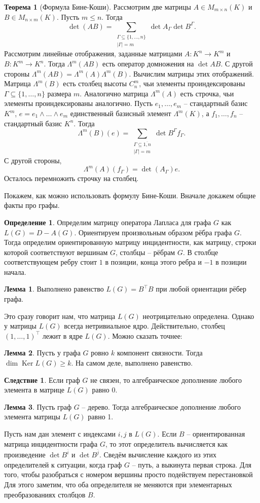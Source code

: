 \documentclass[10pt,a4paper,oneside]{book}
\theoremstyle{definition}
\newtheorem*{defn}{\color{yellow!30!red} Определение}
\newtheorem{thm}{\color{red!40!black}Теорема}
\newtheorem{lem}{\color{green!50!black}Лемма}
\newtheorem{cor}{\color{green!45!black}Следствие}
\renewcommand{\leq}{\leqslant}
\renewcommand{\geq}{\geqslant}
\newcommand{\ovl}{\overline}
\DeclareMathOperator{\Ker}{Ker}
\def\thrm{\begin{thm}}
\def\ethrm{\end{thm}}
\def\dfn{\begin{defn}}
\def\edfn{\end{defn}}
\def\lm{\begin{lem}}
\def\elm{\end{lem}}
\def\crl{\begin{cor}}
\def\ecrl{\end{cor}}
\begin{document}
\thrm[Формула Бине-Коши] Рассмотрим две матрицы $A\in M_{m\times n}(K)$ и $B\in M_{n\times m}(K)$. Пусть $m\leq n$. Тогда
$$\det(AB)=\sum_{\substack{\Gamma \subseteq \{1,\dots,n\}\\ |\Gamma|=m}} \det A_{\Gamma} \det B^{\Gamma}.$$
\proof Рассмотрим линейные отображения, заданные матрицами $A\colon K^n \to K^m$ и  $B \colon K^m \to K^n$. Тогда $\Lambda^m (AB)$ есть оператор домножения на $\det AB$. С другой стороны $\Lambda^m(AB)=\Lambda^m(A) \Lambda^m(B)$. Вычислим матрицы этих отображений. Матрица $\Lambda^m(B)$ есть столбец высоты $C_n^m$, чьи элементы проиндексированы $\Gamma \subseteq \{1,\dots,n\}$ размера $m$. Аналогично матрица $\Lambda^m(A)$  есть строчка, чьи элементы проиндексированы аналогично.
Пусть $e_1,\dots,e_m$ -- стандартный базис $K^m$, $e=e_1\wedge \dots \wedge e_m$ единственный базисный элемент $\Lambda^m(K)$, а $f_1,\dots,f_n$ -- стандартный базис $K^n$. Тогда 
$$\Lambda^m(B)(e)=\sum_{\substack{\Gamma \subseteq \ovl{1,n} \\ |\Gamma|=m}} \det B^{\Gamma} f_{\Gamma}.$$
 С другой стороны, 
$$\Lambda^m(A)(f_{\Gamma})=\det(A_{\Gamma})e.$$
Осталось перемножить строчку на столбец.
\endproof
\ethrm

Покажем, как можно использовать формулу Бине-Коши. Вначале докажем общие факты про графы.

\dfn Определим матрицу оператора Лапласа для графа $G$ как $L(G)=D-A(G)$.
Ориентируем произвольным образом рёбра графа $G$. Тогда определим ориентированную матрицу инцидентности, как матрицу, строки которой соответствуют вершинам $G$, столбцы -- рёбрам $G$. В столбце соответствующем ребру стоит $1$ в позиции, конца этого ребра и $-1$ в позиции начала. 
\edfn

\lm Выполнено равенство $L(G)=B^\top B$ при любой ориентации рёбер графа.
\elm

Это сразу говорит нам, что матрица $L(G)$ неотрицательно определена. Однако у матрицы $L(G)$ всегда нетривиальное ядро. Действительно, столбец $(1,\dots,1)^\top$ лежит в ядре $L(G)$. Можно сказать точнее:

\lm Пусть у графа $G$ ровно $k$ компонент связности. Тогда $\dim \Ker L(G)\geq k$. На самом деле, выполнено равенство.   
\elm

\crl Если граф $G$ не связен, то алгебраическое дополнение любого элемента в матрице $L(G)$ равно $0$.
\ecrl

\lm Пусть граф $G$ -- дерево. Тогда алгебраическое дополнение любого элемента матрицы $L(G)$ равно 1.
\elm
\proof Пусть нам дан элемент с индексами $i,j$ в $L(G)$. Если $B$ -- ориентированная матрица инцидентности графа $G$, то этот определитель вычисляется как произведение  $\det B^{\ovl{i}}$ и $\det B^{\ovl{j}}$. Сведём вычисление каждого из этих определителей к ситуации, когда граф $G$ -- путь, а выкинута первая строка. Для того, чтобы разобраться с номером вершины просто подействуем перестановкой Для этого заметим, что оба определителя не меняются при элементарных преобразованиях столбцов $B$.  
\endproof
\end{document}
